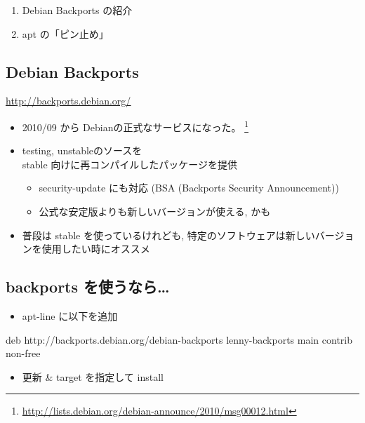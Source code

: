 \documentclass[mingoth,a4paper]{jsarticle}
\begin{document}
\begin{enumerate}
\item Debian Backports の紹介
\item apt の「ピン止め」
\end{enumerate}


\subsection{Debian Backports}

\underline{\url{http://backports.debian.org/}}

\begin{itemize}
\item 2010/09 から Debianの正式なサービスになった。
\footnote{\url{http://lists.debian.org/debian-announce/2010/msg00012.html}}
\item testing, unstableのソースを\\
stable 向けに再コンパイルしたパッケージを提供

\begin{itemize}
\item security-update にも対応 (BSA (Backports Security Announcement))

\item 公式な安定版よりも新しいバージョンが使える, かも
\end{itemize}

\item 普段は stable を使っているけれども,
特定のソフトウェアは新しいバージョンを使用したい時にオススメ
\end{itemize}


\subsection{backports を使うなら\dots{}}

\begin{itemize}
\item apt-line に以下を追加
\end{itemize}

\begin{commandline}
deb http://backports.debian.org/debian-backports lenny-backports main contrib non-free
\end{commandline}

\begin{itemize}
\item 更新 \& target を指定して install
\end{itemize}
\end{document}
